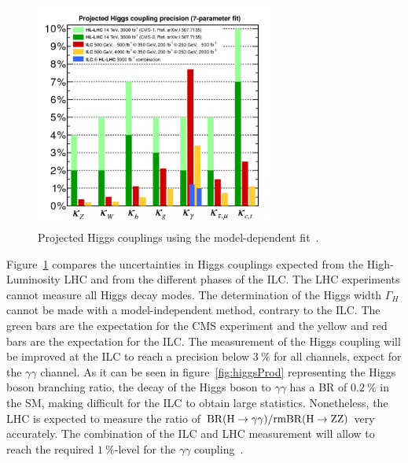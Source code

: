     \begin{figure}[!tbh]
      \centering
      \includegraphics[width = 0.7\textwidth]{Pictures/Higgs/Figures_HiggsCoupling500LHC.pdf}
      \caption{Projected Higgs couplings using the model-dependent fit~\cite{Fujii2015}.}
      \label{fig:Hcouplings}
    \end{figure}
    
    Figure~\ref{fig:Hcouplings} compares the uncertainties in Higgs couplings expected from the High-Luminosity \gls{LHC} and from the different phases of the \gls{ILC}.
    The \gls{LHC} experiments cannot measure all Higgs decay modes. 
    The determination of the Higgs width $\Gamma_H$ cannot be made with a model-independent method, contrary to the \gls{ILC}.
    The green bars are the expectation for the CMS experiment and the yellow and red bars are the expectation for the \gls{ILC}.
    The measurement of the Higgs coupling will be improved at the \gls{ILC} to reach a precision below $3~\%$ for all channels, expect for the $\gamma \gamma$ channel.
    As it can be seen in figure~\ref{fig:higgsProd} representing the Higgs boson branching ratio, the decay of the Higgs boson to $\gamma \gamma$ has a \gls{BR} of $0.2~\%$ in the \gls{SM}, making difficult for the \gls{ILC} to obtain large statistics.
    Nonetheless, the \gls{LHC} is expected to measure the ratio of $\rm{BR}(H \rightarrow \gamma\gamma)/rm{BR}(H \rightarrow ZZ)$ very accurately.
    The combination of the \gls{ILC} and \gls{LHC} measurement will allow to reach the required $1~\%$-level for the $\gamma\gamma$ coupling~\cite{Fujii2015}.


